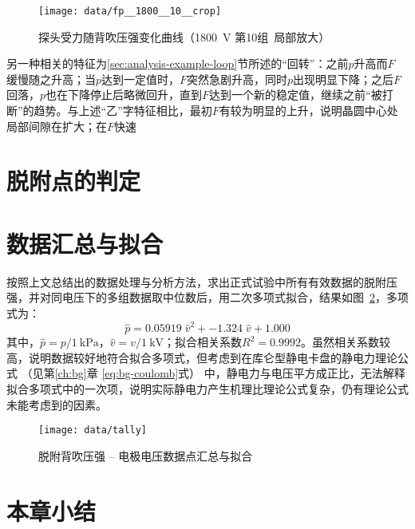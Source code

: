 \begin{figure}[thbp]
\centering
\texttt{[image: data/fp\_\_1800\_\_10\_\_crop]}
\caption{探头受力随背吹压强变化曲线（\SI{1800}{\V} 第10组\ 局部放大）}
\label{fig:data-fp-1800-10-crop}
\end{figure}

另一种相关的特征为\ref{sec:analysis-example-loop}节所述的“回转”：之前$p$升高而$F$ 缓慢随之升高；当$p$达到一定值时，$F$突然急剧升高，同时$p$出现明显下降；之后$F$回落，$p$也在下降停止后略微回升，直到$F$达到一个新的稳定值，继续之前“被打断”的趋势。与上述“乙”字特征相比，最初$F$有较为明显的上升，说明晶圆中心处局部间隙在扩大；在$F$快速







\section{脱附点的判定}\label{sec:analysis-criterion}





\section{数据汇总与拟合}\label{sec:analysis-tally}

按照上文总结出的数据处理与分析方法，求出正式试验中所有有效数据的脱附压强，并对同电压下的多组数据取中位数\footnotemark{}后，用二次多项式拟合，结果如图~\ref{fig:data-tally}，多项式为：
\[
\hat{p} = 0.05919\;\hat{v}^2 + -1.324\;\hat{v} + 1.000
\]
其中，$\hat{p} = p / \SI{1}{\kPa}$，$\hat{v} = v / \SI{1}{\kV}$；拟合相关系数$R^2 = \num{0.9992}$。虽然相关系数较高，说明数据较好地符合拟合多项式，但考虑到在库仑型静电卡盘的静电力理论公式%
（见第\ref{ch:bg}章 \eqref{eq:bg-coulomb}式）%
中，静电力与电压平方成正比，无法解释拟合多项式中的一次项，说明实际静电力产生机理比理论公式复杂，仍有理论公式未能考虑到的因素。


\begin{figure}[thbp]
\centering
\texttt{[image: data/tally]}
\caption{脱附背吹压强 -- 电极电压数据点汇总与拟合}
\label{fig:data-tally}
\end{figure}



\section{本章小结}\label{sec:analysis-summary}


